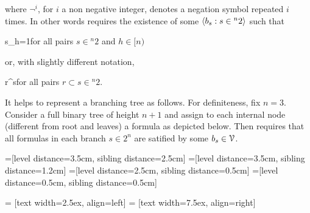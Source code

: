 \documentclass[scombinatorics.tex]{subfiles}
\begin{document}
where $\neg^i$, for $i$ a non negative integer, denotes a negation symbol repeated $i$ times.
In other words  requires the existence of some $\langle b_s:s\in{}^n2\rangle$ such that

{\IFF}
{s_h=1}\hfill for all pairs $s\in {}^n2$ and $h\in[n)$

or, with slightly different notation,

{\IFF}
{r^\subseteq s}\hfill for all pairs $r\subset s\in {}^n2$.

It helps to represent a branching tree as follows.
For definiteness, fix $n=3$.
Consider a full binary tree of height $n+1$ and assign to each internal node (different from root and leaves) a formula as depicted below.
Then  requires that all formulas in each branch $s\in2^n$ are satified by some $b_s\in\EuScript V$.
\medskip

=[level distance=3.5cm, sibling distance=2.5cm]
=[level distance=3.5cm, sibling distance=1.2cm]
=[level distance=2.5cm, sibling distance=0.5cm]
=[level distance=0.5cm, sibling distance=0.5cm]

 = [text width=2.5ex, align=left]
 = [text width=7.5ex, align=right]
\end{document}
